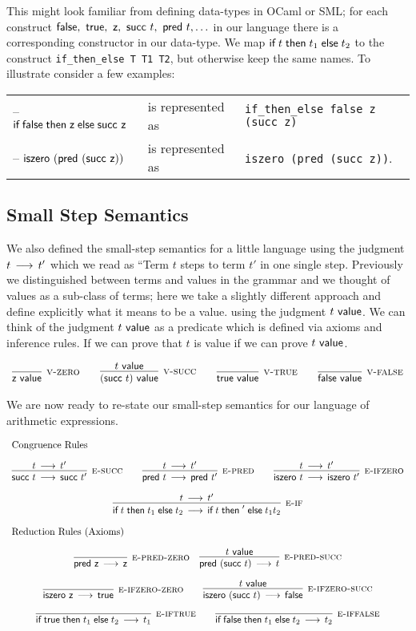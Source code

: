This might look familiar from defining data-types in OCaml or SML; for each
construct $\textsf{false},~\textsf{true},~\textsf{z},~ \textsf{succ}~t,~\textsf{pred}~t, \ldots$ in our
language there is a corresponding constructor in our data-type. We map
$\textsf{if\;} t \textsf{\;then\;} t_1 \textsf{\;else\;} t_2$ to the construct \lstinline!if_then_else T T1 T2!, but otherwise keep the
same names. To illustrate consider a few examples:

\begin{tabular}{lll}
-- $\textsf{if\;} \textsf{false} \textsf{\;then\;} \textsf{z} \textsf{\;else\;} \textsf{succ}~\textsf{z}$ & is represented as  &
\lstinline!if_then_else false z (succ z)!\\
-- $\textsf{iszero}~(\textsf{pred}~(\textsf{succ}~\textsf{z}))$ & is represented as & \lstinline!iszero (pred (succ z))!.
\end{tabular}

\subsection{Small Step Semantics}
We also defined the small-step semantics for a little language using the
judgment $t \mathrel{\,\longrightarrow\,} t'$ which we read as ``Term $t$ steps to term $t'$ in one
single step. Previously we distinguished between terms and values in the
grammar and we thought of values as a sub-class of terms; here we take a slightly
different approach and define explicitly what it means to be a value.
using the judgment $t ~\textsf{value}$. We can think of the judgment $t ~\textsf{value}$ as a
predicate which is defined via axioms and inference rules. If we can prove that
$t$ is value if we can prove $t ~\textsf{value}$.


\[
\begin{array}{c}
\infer[\Vzero]{\tmzero \isv}{} \qquad \infer[\Vsuc]{(\tmsucc t) \isv}{t \isv}
\qquad \infer[\Vtrue]{\tmtrue \isv}{}
\qquad \infer[\Vfalse]{\tmfalse \isv}{}
\end{array}
\]

We are now ready to re-state our small-step semantics for our language of
arithmetic expressions.

\[
\begin{array}{c}
\multicolumn{1}{l}{\mbox{\text{Congruence Rules}}}\\[1em]
\infer[\SSUC]{\tmsucc t \steps \tmsucc t'}{t \steps t'}
\qquad
\infer[\SPRED]{\tmpred t \steps \tmpred t'}{t \steps t'} \qquad
\infer[\SISZERO]{\tmiszero t \steps \tmiszero t'}{t \steps t'}
\\[1em]
\infer[\SIF]{\tmif t {t_1}{t_2} \steps \tmif t' {t_1}{t_2}}{t \steps t'}
\\[1em]
\multicolumn{1}{l}{\mbox{\text{Reduction Rules (Axioms)}}}\\[1em]
\infer[\SPREDZ]{\tmpred \tmzero \steps \tmzero}{}\quad
\infer[\SPREDSUCC]{\tmpred (\tmsucc t) \steps t}{t \isv}\\[1em]
\infer[\SISZEROZ]{\tmiszero \tmzero \steps \tmtrue}{} \qquad
\infer[\SISZEROSUCC]{\tmiszero (\tmsucc t) \steps \tmfalse}{t \isv} \\[1em]
\infer[\SIFT]{\tmif \tmtrue {t_1}{t_2} \steps t_1}{}\qquad
\infer[\SIFF]{\tmif \tmfalse {t_1}{t_2} \steps t_2}{}
\end{array}
\]

